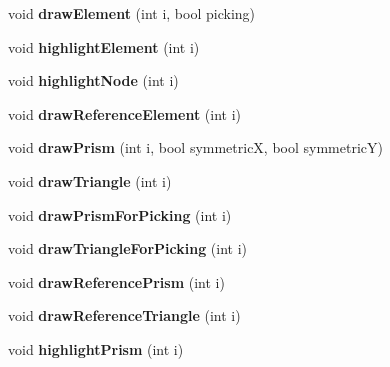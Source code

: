 \begin{DoxyCompactItemize}
\item 
\hypertarget{classGLWidget_aa85fc1e14fb11fc62ce93cc72ffb5a61}{}void {\bfseries draw\+Element} (int i, bool picking)\label{classGLWidget_aa85fc1e14fb11fc62ce93cc72ffb5a61}

\item 
\hypertarget{classGLWidget_ada0503af64f483c91e342ba5c3dcef49}{}void {\bfseries highlight\+Element} (int i)\label{classGLWidget_ada0503af64f483c91e342ba5c3dcef49}

\item 
\hypertarget{classGLWidget_addb75eed990f0b943d47009f14e8a3de}{}void {\bfseries highlight\+Node} (int i)\label{classGLWidget_addb75eed990f0b943d47009f14e8a3de}

\item 
\hypertarget{classGLWidget_a7be96b028f099e61dfbc75254316c078}{}void {\bfseries draw\+Reference\+Element} (int i)\label{classGLWidget_a7be96b028f099e61dfbc75254316c078}

\item 
\hypertarget{classGLWidget_a523f68e2bf91f762bbd4fb5ab734e737}{}void {\bfseries draw\+Prism} (int i, bool symmetric\+X, bool symmetric\+Y)\label{classGLWidget_a523f68e2bf91f762bbd4fb5ab734e737}

\item 
\hypertarget{classGLWidget_a61c80b66b9686c4325dec480f6d3eef9}{}void {\bfseries draw\+Triangle} (int i)\label{classGLWidget_a61c80b66b9686c4325dec480f6d3eef9}

\item 
\hypertarget{classGLWidget_a36c00f9f2aec8eff1291efd1416be16e}{}void {\bfseries draw\+Prism\+For\+Picking} (int i)\label{classGLWidget_a36c00f9f2aec8eff1291efd1416be16e}

\item 
\hypertarget{classGLWidget_a1b670bed499c7bb756cae4b7b2153426}{}void {\bfseries draw\+Triangle\+For\+Picking} (int i)\label{classGLWidget_a1b670bed499c7bb756cae4b7b2153426}

\item 
\hypertarget{classGLWidget_aae1cc6d1837d0d0bb454eb0dda4b5a7c}{}void {\bfseries draw\+Reference\+Prism} (int i)\label{classGLWidget_aae1cc6d1837d0d0bb454eb0dda4b5a7c}

\item 
\hypertarget{classGLWidget_a80bd480b4e4828e7cc6e043805f804ac}{}void {\bfseries draw\+Reference\+Triangle} (int i)\label{classGLWidget_a80bd480b4e4828e7cc6e043805f804ac}

\item 
\hypertarget{classGLWidget_a3486092418bb1d3050860c7b4539fef1}{}void {\bfseries highlight\+Prism} (int i)\label{classGLWidget_a3486092418bb1d3050860c7b4539fef1}


\end{DoxyCompactItemize}
